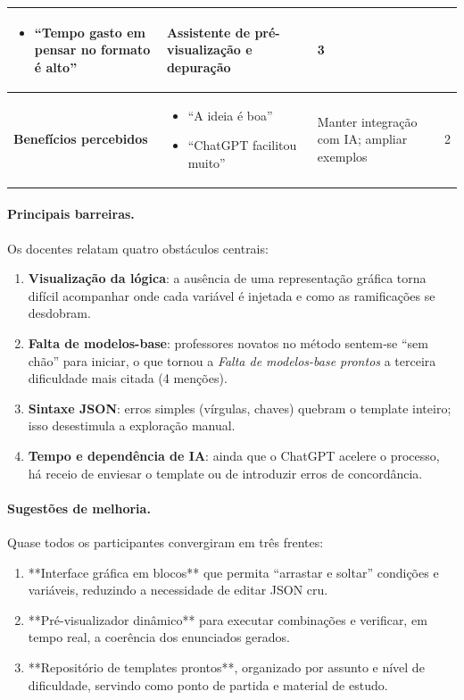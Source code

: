 \begin{table}[H]
\begin{tabular}{p{} p{} p{} p{}}
\begin{itemize}[leftmargin=*]
    \item “Tempo gasto em pensar no formato é alto” 
\end{itemize} & Assistente de pré-visualização e depuração & 3 \\ \midrule
\textbf{Benefícios percebidos} & \begin{itemize}[leftmargin=*]
    \item “A ideia é boa” \newline
    \item “ChatGPT facilitou muito”
\end{itemize} & Manter integração com IA; ampliar exemplos & 2 \\ \bottomrule
\end{tabular}
\end{table}

\paragraph{Principais barreiras.}
Os docentes relatam quatro obstáculos centrais:

\begin{enumerate}[label=(\alph*)]
    \item \textbf{Visualização da lógica}: a ausência de uma representação gráfica torna difícil acompanhar onde cada variável é injetada e como as ramificações se desdobram.
    \item \textbf{Falta de modelos-base}: professores novatos no método sentem‐se “sem chão” para iniciar, o que tornou a \emph{Falta de modelos-base prontos} a terceira dificuldade mais citada (4 menções).
    \item \textbf{Sintaxe JSON}: erros simples (vírgulas, chaves) quebram o template inteiro; isso desestimula a exploração manual.
    \item \textbf{Tempo e dependência de IA}: ainda que o ChatGPT acelere o processo, há receio de enviesar o template ou de introduzir erros de concordância.
\end{enumerate}

\paragraph{Sugestões de melhoria.}
Quase todos os participantes convergiram em três frentes:

\begin{enumerate}[label=(\roman*)]
    \item **Interface gráfica em blocos** que permita “arrastar e soltar” condições e variáveis, reduzindo a necessidade de editar JSON cru.
    \item **Pré-visualizador dinâmico** para executar combinações e verificar, em tempo real, a coerência dos enunciados gerados.
    \item **Repositório de templates prontos**, organizado por assunto e nível de dificuldade, servindo como ponto de partida e material de estudo.
\end{enumerate}


